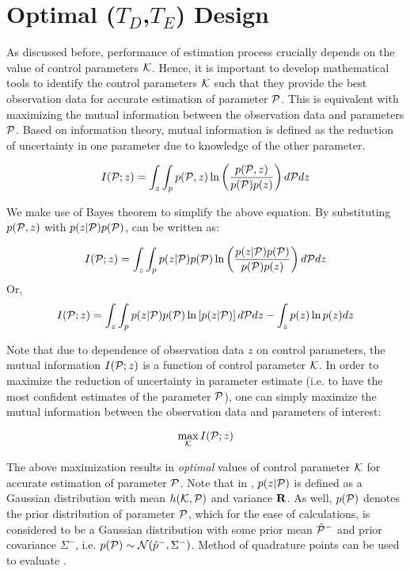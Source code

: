 \documentclass{article}         %
\theoremstyle{definition}
\theoremstyle{remark}
\begin{document}
\section{Optimal ($T_D$,$T_E$) Design}\label{oed}
As discussed before, performance of estimation process crucially depends on the value of control parameters $\mathcal{K}$. Hence, it is important to develop mathematical tools to identify the control parameters $\mathcal{K}$ such that they provide the best observation data for accurate estimation of parameter $\mathcal{P}$. This is equivalent with maximizing the mutual information between the observation data and parameters $\mathcal{P}$. Based on information theory, mutual information is defined as the reduction of uncertainty in one parameter due to knowledge of the other parameter.

\begin{equation} \label{mi}
I(\mathcal{P};z)=\int_z\int_p p(\mathcal{P},z)\ln\left(\frac{p(\mathcal{P},z)}{p(\mathcal{P})p(z)}\right)d\mathcal{P} dz
\end{equation}

We make use of Bayes theorem to simplify the above equation. By substituting $p(\mathcal{P},z)$ with $p(z|\mathcal{P})p(\mathcal{P})$,  can be written as:

\begin{equation} \label{mi2}
I(\mathcal{P};z)=\int_z\int_p p(z|\mathcal{P})p(\mathcal{P})\ln\left(\frac{p(z|\mathcal{P})p(\mathcal{P})}{p(\mathcal{P})p(z)}\right)d\mathcal{P} dz
\end{equation}
Or,
\begin{equation} \label{mi3}
I(\mathcal{P};z)=\int_z\int_p p(z|\mathcal{P})p(\mathcal{P})\ln\left[p(z|\mathcal{P})\right]d\mathcal{P} dz - \int_z p(z) \ln p(z)dz
\end{equation}



Note that due to dependence of observation data $z$ on control parameters, the mutual information $I(\mathcal{P};z)$ is a function of control parameter $\mathcal{K}$. In order to maximize the reduction of uncertainty in parameter estimate (i.e. to have the most confident estimates of the parameter $\mathcal{P}$), one can simply maximize the mutual information between the observation data and parameters of interest:

\begin{equation}\label{mimax}
\max_{\mathcal{K}} I(\mathcal{P};z)
\end{equation}

The above maximization results in \textit{optimal} values of control parameter $\mathcal{K}$ for accurate estimation of parameter $\mathcal{P}$. Note that in , $p(z|\mathcal{P})$ is defined as a Gaussian distribution with mean $h(\mathcal{K},\mathcal{P})$ and variance $\mathbf{R}$. As well, $p(\mathcal{P})$ denotes the prior distribution of parameter $\mathcal{P}$, which for the ease of calculations, is considered to be a Gaussian distribution with some prior mean $\hat{\mathcal{P}}^-$ and prior covariance $\Sigma^-$, i.e. $p(\mathcal{P})\sim \mathcal{N}(\hat{p}^-,\Sigma^-)$. Method of quadrature points can be used to evaluate . 
\end{document}
